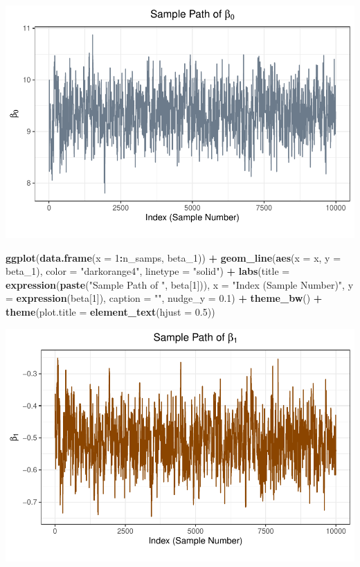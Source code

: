 \documentclass[
]{article}
\newenvironment{Shaded}{\begin{snugshade}}{\end{snugshade}}
\newcommand{\AttributeTok}[1]{\textcolor[rgb]{0.13,0.29,0.53}{#1}}
\newcommand{\DecValTok}[1]{\textcolor[rgb]{0.00,0.00,0.81}{#1}}
\newcommand{\FloatTok}[1]{\textcolor[rgb]{0.00,0.00,0.81}{#1}}
\newcommand{\FunctionTok}[1]{\textcolor[rgb]{0.13,0.29,0.53}{\textbf{#1}}}
\newcommand{\NormalTok}[1]{#1}
\newcommand{\SpecialCharTok}[1]{\textcolor[rgb]{0.81,0.36,0.00}{\textbf{#1}}}
\newcommand{\StringTok}[1]{\textcolor[rgb]{0.31,0.60,0.02}{#1}}
\begin{document}
\includegraphics{Homework_6_files/figure-latex/prob4b-1.pdf}

\begin{Shaded}
\begin{Highlighting}[]
\FunctionTok{ggplot}\NormalTok{(}\FunctionTok{data.frame}\NormalTok{(}\AttributeTok{x =} \DecValTok{1}\SpecialCharTok{:}\NormalTok{n\_samps, beta\_1)) }\SpecialCharTok{+}
  \FunctionTok{geom\_line}\NormalTok{(}\FunctionTok{aes}\NormalTok{(}\AttributeTok{x =}\NormalTok{ x, }\AttributeTok{y =}\NormalTok{ beta\_1), }\AttributeTok{color =} \StringTok{"darkorange4"}\NormalTok{, }\AttributeTok{linetype =} \StringTok{"solid"}\NormalTok{) }\SpecialCharTok{+}
  \FunctionTok{labs}\NormalTok{(}\AttributeTok{title =} \FunctionTok{expression}\NormalTok{(}\FunctionTok{paste}\NormalTok{(}\StringTok{"Sample Path of "}\NormalTok{, beta[}\DecValTok{1}\NormalTok{])),}
       \AttributeTok{x =} \StringTok{"Index (Sample Number)"}\NormalTok{, }\AttributeTok{y =} \FunctionTok{expression}\NormalTok{(beta[}\DecValTok{1}\NormalTok{]), }
       \AttributeTok{caption =} \StringTok{""}\NormalTok{, }\AttributeTok{nudge\_y =} \FloatTok{0.1}\NormalTok{) }\SpecialCharTok{+}
  \FunctionTok{theme\_bw}\NormalTok{() }\SpecialCharTok{+}
  \FunctionTok{theme}\NormalTok{(}\AttributeTok{plot.title =} \FunctionTok{element\_text}\NormalTok{(}\AttributeTok{hjust =} \FloatTok{0.5}\NormalTok{))}
\end{Highlighting}
\end{Shaded}

\includegraphics{Homework_6_files/figure-latex/prob4b-2.pdf}
\end{document}

